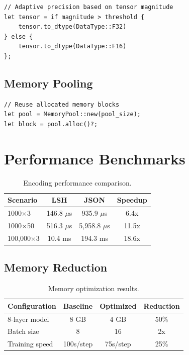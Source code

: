 \documentclass{article}
\begin{document}
\begin{verbatim}
// Adaptive precision based on tensor magnitude
let tensor = if magnitude > threshold {
    tensor.to_dtype(DataType::F32)
} else {
    tensor.to_dtype(DataType::F16)
};
\end{verbatim}

\subsection{Memory Pooling}

\begin{verbatim}
// Reuse allocated memory blocks
let pool = MemoryPool::new(pool_size);
let block = pool.alloc()?;
\end{verbatim}

\section{Performance Benchmarks}

\begin{table}[h]
\centering
\caption{Encoding performance comparison.}
\label{tab:benchmark}
\begin{tabular}{lccc}
\toprule
\textbf{Scenario} & \textbf{LSH} & \textbf{JSON} & \textbf{Speedup} \\
\midrule
1000$\times$3 & 146.8 $\mu$s & 935.9 $\mu$s & 6.4x \\
1000$\times$50 & 516.3 $\mu$s & 5,958.8 $\mu$s & 11.5x \\
100,000$\times$3 & 10.4 ms & 194.3 ms & 18.6x \\
\bottomrule
\end{tabular}
\end{table}

\subsection{Memory Reduction}

\begin{table}[h]
\centering
\caption{Memory optimization results.}
\label{tab:memory}
\begin{tabular}{lccc}
\toprule
\textbf{Configuration} & \textbf{Baseline} & \textbf{Optimized} & \textbf{Reduction} \\
\midrule
8-layer model & 8 GB & 4 GB & 50\% \\
Batch size & 8 & 16 & 2x \\
Training speed & 100s/step & 75s/step & 25\% \\
\bottomrule
\end{tabular}
\end{table}
\end{document}
